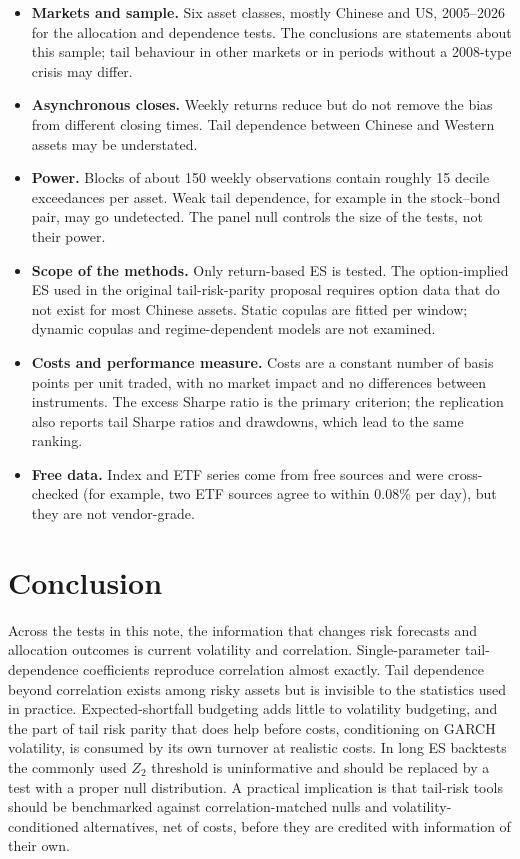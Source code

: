 \documentclass[11pt]{article}
\newcommand{\1}{\mathbf{1}}
\begin{document}
\begin{itemize}
\item \textbf{Markets and sample.} Six asset classes, mostly Chinese and US, 2005--2026 for the allocation and
dependence tests. The conclusions are statements about this sample; tail behaviour in other markets or in
periods without a 2008-type crisis may differ.
\item \textbf{Asynchronous closes.} Weekly returns reduce but do not remove the bias from different closing
times. Tail dependence between Chinese and Western assets may be understated.
\item \textbf{Power.} Blocks of about 150 weekly observations contain roughly 15 decile exceedances per asset.
Weak tail dependence, for example in the stock--bond pair, may go undetected. The panel null controls the
size of the tests, not their power.
\item \textbf{Scope of the methods.} Only return-based ES is tested. The option-implied ES used in the
original tail-risk-parity proposal requires option data that do not exist for most Chinese assets. Static
copulas are fitted per window; dynamic copulas \citep{patton2006} and regime-dependent models are not
examined.
\item \textbf{Costs and performance measure.} Costs are a constant number of basis points per unit traded, with
no market impact and no differences between instruments. The excess Sharpe ratio is the primary criterion;
the replication also reports tail Sharpe ratios and drawdowns, which lead to the same ranking.
\item \textbf{Free data.} Index and ETF series come from free sources and were cross-checked (for example, two
ETF sources agree to within 0.08\% per day), but they are not vendor-grade.
\end{itemize}

\section{Conclusion}

Across the tests in this note, the information that changes risk forecasts and allocation outcomes is current
volatility and correlation. Single-parameter tail-dependence coefficients reproduce correlation almost
exactly. Tail dependence beyond correlation exists among risky assets but is invisible to the statistics used
in practice. Expected-shortfall budgeting adds little to volatility budgeting, and the part of tail risk parity
that does help before costs, conditioning on GARCH volatility, is consumed by its own turnover at realistic
costs. In long ES backtests the commonly used $Z_2$ threshold is uninformative and should be replaced by a
test with a proper null distribution. A practical implication is that tail-risk tools should be benchmarked
against correlation-matched nulls and volatility-conditioned alternatives, net of costs, before they are
credited with information of their own.
\end{document}
